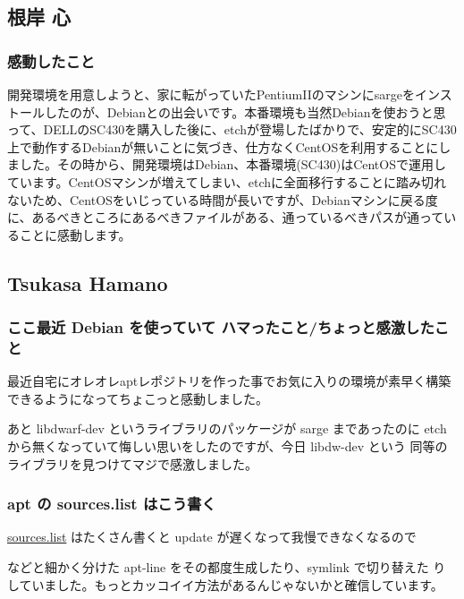 \documentclass[mingoth,a4paper]{jsarticle}
\begin{document}
\subsection{根岸 心}

\subsubsection{感動したこと}

開発環境を用意しようと、家に転がっていたPentiumIIのマシンにsargeをインストールしたのが、Debianとの出会いです。本番環境も当然Debianを使おうと思って、DELLのSC430を購入した後に、etchが登場したばかりで、安定的にSC430上で動作するDebianが無いことに気づき、仕方なくCentOSを利用することにしました。その時から、開発環境はDebian、本番環境(SC430)はCentOSで運用しています。CentOSマシンが増えてしまい、etchに全面移行することに踏み切れないため、CentOSをいじっている時間が長いですが、Debianマシンに戻る度に、あるべきところにあるべきファイルがある、通っているべきパスが通っていることに感動します。


\subsection{Tsukasa Hamano}

\subsubsection{ここ最近 Debian を使っていて ハマったこと/ちょっと感激したこと}

最近自宅にオレオレaptレポジトリを作った事でお気に入りの環境が素早く構築
できるようになってちょこっと感動しました。

あと libdwarf-dev というライブラリのパッケージが sarge まであったのに
etch から無くなっていて悔しい思いをしたのですが、今日 libdw-dev という
同等のライブラリを見つけてマジで感激しました。

\subsubsection{apt の sources.list はこう書く}

\url{sources.list} はたくさん書くと update が遅くなって我慢できなくなるので

\begin{commandline}
\end{commandline}

などと細かく分けた apt-line をその都度生成したり、symlink で切り替えた
りしていました。もっとカッコイイ方法があるんじゃないかと確信しています。
\end{document}
